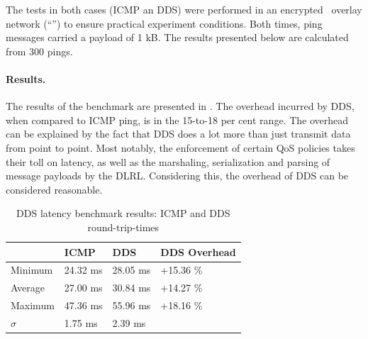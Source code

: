 The tests in both cases (ICMP an DDS) were performed in an encrypted \wnet\ overlay network (``'') to ensure practical experiment conditions. Both times, ping messages carried a payload of 1 kB. The results presented below are calculated from 300 pings.


\paragraph{Results.}
The results of the benchmark are presented in . The overhead incurred by DDS, when compared to ICMP ping, is in the 15-to-18 per cent range. The overhead can be explained by the fact that DDS does a lot more than just transmit data from point to point. Most notably, the enforcement of certain QoS policies takes their toll on latency, as well as the marshaling, serialization and parsing of message payloads by the DLRL. Considering this, the overhead of DDS can be considered reasonable.

\begin{table}[H]
  \caption[DDS latecy benchmark results]{DDS latency benchmark results: ICMP and DDS round-trip-times}\label{tab:dds-latency}
  \centering
  \begin{tabular}{p{} | p{} p{} | p{}}
    \toprule
       & \textbf{ICMP} & \textbf{DDS} & \textbf{DDS Overhead} \\
    \midrule
    	Minimum & 24.32 ms & 28.05 ms & +15.36 \%\\
    	Average & 27.00 ms & 30.84 ms & +14.27 \%\\
    	Maximum & 47.36 ms & 55.96 ms & +18.16 \% \\
    	$\sigma$ & 1.75 ms & 2.39 ms &\\
    \bottomrule
  \end{tabular}
\end{table}
%
%
%
%
%
%
%
%
%
%
